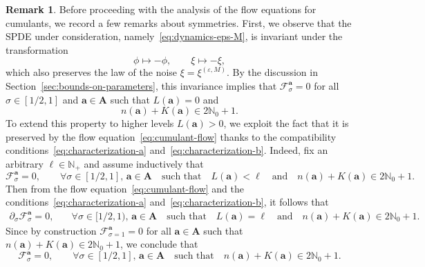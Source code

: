 \documentclass{article}
\numberwithin{equation}{section}
\theoremstyle{plain}
\theoremstyle{definition}
\newtheorem{remark}[theorem]{Remark}
\begin{document}
\begin{remark}
  \label{rem:symmetries}Before proceeding with the analysis of the flow
  equations for cumulants, we record a few remarks about symmetries. First, we
  observe that the SPDE under consideration, namely~\eqref{eq:dynamics-eps-M},
  is invariant under the transformation
  \[ \phi \mapsto - \phi, \qquad \xi \mapsto - \xi, \]
  which also preserves the law of the noise $\xi = \xi^{(\varepsilon, M)}$. By
  the discussion in Section~\ref{sec:bounds-on-parameters}, this invariance
  implies that $\mathcal{F}^{\boldsymbol{a}}_{\sigma} = 0$ for all $\sigma \in
  [1/2, 1]$ and $\boldsymbol{a} \in \boldsymbol{A}$ such that $L (\boldsymbol{a}) = 0$
  and
  \[ n (\boldsymbol{a}) + K (\boldsymbol{a}) \in 2\mathbb{N}_0 + 1. \]
  To extend this property to higher levels $L
  (\boldsymbol{a}) > 0$, we exploit the fact that it is preserved by the flow
  equation~\eqref{eq:cumulant-flow} thanks to the compatibility
  conditions~\eqref{eq:characterization-a} and~\eqref{eq:characterization-b}.
  Indeed, fix an arbitrary $\ell \in \mathbb{N}_+$ and assume inductively that
  \[ \mathcal{F}^{\boldsymbol{a}}_{\sigma} = 0, \qquad \forall \sigma \in [1/2,
     1],\, \boldsymbol{a} \in \boldsymbol{A} \quad \text{such that}
     \quad L (\boldsymbol{a}) < \ell \quad \text{and} \quad n (\boldsymbol{a}) + K
     (\boldsymbol{a}) \in 2\mathbb{N}_0 + 1. \]
  Then from the flow equation~\eqref{eq:cumulant-flow} and the
  conditions~\eqref{eq:characterization-a} and~\eqref{eq:characterization-b},
  it follows that
  \begin{align*}
     \partial_{\sigma} \mathcal{F}^{\boldsymbol{a}}_{\sigma} = 0,
     &\quad \forall \sigma \in [1/2, 1), \,\boldsymbol{a} \in \boldsymbol{A}
     \quad \text{such that} \quad
     L (\boldsymbol{a}) = \ell \quad \text{and} \quad
     n (\boldsymbol{a}) + K (\boldsymbol{a}) \in 2\mathbb{N}_0 + 1.
  \end{align*}
  Since by construction $\mathcal{F}^{\boldsymbol{a}}_{\sigma = 1} = 0$ for all
  $\boldsymbol{a} \in \boldsymbol{A}$ such that $n (\boldsymbol{a}) + K
  (\boldsymbol{a}) \in 2\mathbb{N}_0 + 1$, we conclude that
  \[ \mathcal{F}^{\boldsymbol{a}}_{\sigma} = 0, \qquad \forall \sigma \in [1/2,
     1],\, \boldsymbol{a} \in \boldsymbol{A} \quad \text{such that}
     \quad n (\boldsymbol{a}) + K (\boldsymbol{a}) \in 2\mathbb{N}_0 + 1. \]
  

\end{remark}
\end{document}
